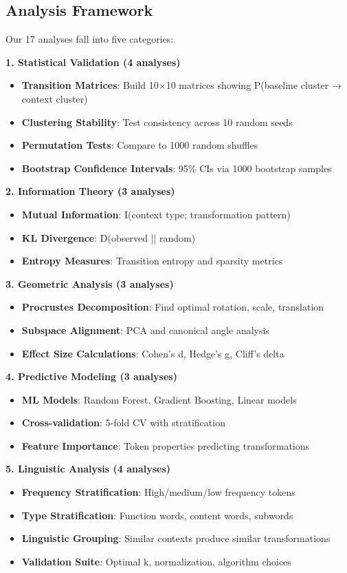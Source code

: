 \documentclass[11pt]{article}
\begin{document}
\subsection{Analysis Framework}

Our 17 analyses fall into five categories:

\textbf{1. Statistical Validation (4 analyses)}
\begin{itemize}
\item \textbf{Transition Matrices}: Build 10×10 matrices showing P(baseline cluster → context cluster)
\item \textbf{Clustering Stability}: Test consistency across 10 random seeds
\item \textbf{Permutation Tests}: Compare to 1000 random shuffles
\item \textbf{Bootstrap Confidence Intervals}: 95\% CIs via 1000 bootstrap samples
\end{itemize}

\textbf{2. Information Theory (3 analyses)}
\begin{itemize}
\item \textbf{Mutual Information}: I(context type; transformation pattern)
\item \textbf{KL Divergence}: D(observed || random)
\item \textbf{Entropy Measures}: Transition entropy and sparsity metrics
\end{itemize}

\textbf{3. Geometric Analysis (3 analyses)}
\begin{itemize}
\item \textbf{Procrustes Decomposition}: Find optimal rotation, scale, translation
\item \textbf{Subspace Alignment}: PCA and canonical angle analysis
\item \textbf{Effect Size Calculations}: Cohen's d, Hedge's g, Cliff's delta
\end{itemize}

\textbf{4. Predictive Modeling (3 analyses)}
\begin{itemize}
\item \textbf{ML Models}: Random Forest, Gradient Boosting, Linear models
\item \textbf{Cross-validation}: 5-fold CV with stratification
\item \textbf{Feature Importance}: Token properties predicting transformations
\end{itemize}

\textbf{5. Linguistic Analysis (4 analyses)}
\begin{itemize}
\item \textbf{Frequency Stratification}: High/medium/low frequency tokens
\item \textbf{Type Stratification}: Function words, content words, subwords
\item \textbf{Linguistic Grouping}: Similar contexts produce similar transformations
\item \textbf{Validation Suite}: Optimal k, normalization, algorithm choices
\end{itemize}
\end{document}
